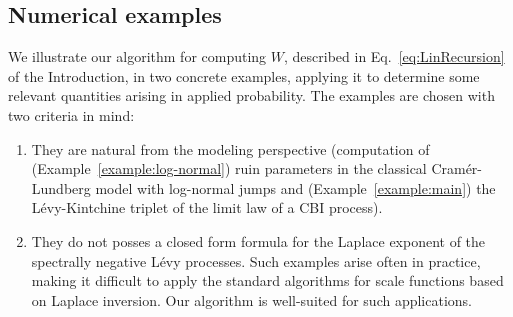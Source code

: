 \documentclass[pdftex,oneside,11pt,reqno]{amsart}
\theoremstyle{definition}
\theoremstyle{theorem}
\theoremstyle{remark}
\numberwithin{equation}{section}
\numberwithin{definition}{section}
\begin{document}
\subsection{Numerical examples}
We illustrate our algorithm for computing ${W}$, described in Eq.~\eqref{eq:LinRecursion} of the Introduction, in two concrete examples, applying it to determine some relevant quantities arising in applied probability. The examples are chosen with two criteria in mind:
\begin{enumerate}
\item They are natural from the modeling perspective (computation of (Example~\ref{example:log-normal}) ruin parameters in the classical Cram\'er-Lundberg model with log-normal jumps  and (Example~\ref{example:main}) the L\'evy-Kintchine triplet of the limit law of a CBI process). 
\item They do not posses a closed form formula 
for the Laplace exponent of the spectrally negative L\'evy processes. Such examples arise often in practice, making it difficult to apply the standard algorithms for scale functions based on Laplace inversion. Our algorithm is well-suited for such applications.
\end{enumerate}
\end{document}

